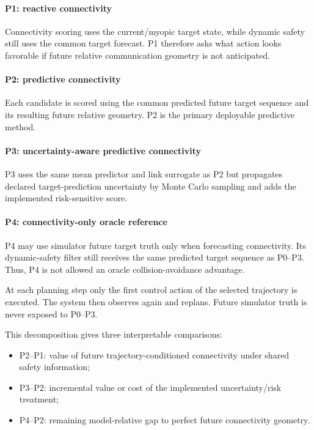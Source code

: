 \documentclass[journal]{IEEEtran}
\begin{document}
\paragraph{P1: reactive connectivity}
Connectivity scoring uses the current/myopic target state, while dynamic safety still uses the common target forecast. P1 therefore asks what action looks favorable if future relative communication geometry is not anticipated.

\paragraph{P2: predictive connectivity}
Each candidate is scored using the common predicted future target sequence and its resulting future relative geometry. P2 is the primary deployable predictive method.

\paragraph{P3: uncertainty-aware predictive connectivity}
P3 uses the same mean predictor and link surrogate as P2 but propagates declared target-prediction uncertainty by Monte Carlo sampling and adds the implemented risk-sensitive score.

\paragraph{P4: connectivity-only oracle reference}
P4 may use simulator future target truth only when forecasting connectivity. Its dynamic-safety filter still receives the same predicted target sequence as P0--P3. Thus, P4 is not allowed an oracle collision-avoidance advantage.

At each planning step only the first control action of the selected trajectory is executed. The system then observes again and replans. Future simulator truth is never exposed to P0--P3.

This decomposition gives three interpretable comparisons:
\begin{itemize}
\item P2--P1: value of future trajectory-conditioned connectivity under shared safety information;
\item P3--P2: incremental value or cost of the implemented uncertainty/risk treatment;
\item P4--P2: remaining model-relative gap to perfect future connectivity geometry.
\end{itemize}
\end{document}
